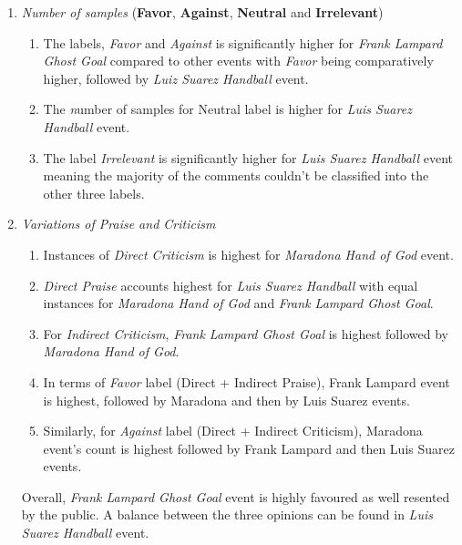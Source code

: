 \documentclass[sigconf, review]{acmart}
\begin{document}
\begin{enumerate}
    \item \textit{Number of samples} (\textbf{Favor}, \textbf{Against}, \textbf{Neutral} and \textbf{Irrelevant})
    \begin{enumerate}
    \item The labels, \textit{Favor} and \textit{Against} is significantly higher for  \textit{Frank Lampard Ghost Goal} compared to other events with \textit{Favor} being comparatively higher, followed by \textit{Luiz Suarez Handball} event.
    \item The \textit number of samples for {Neutral} label is higher for \textit{Luis Suarez Handball} event.
    \item The label \textit{Irrelevant} is significantly higher for \textit{Luis Suarez Handball} event meaning the majority of the comments couldn't be classified into the other three labels.
   
    \end{enumerate}
    \item \textit{Variations of Praise and Criticism}
    \begin{enumerate}
        \item Instances of \textit{Direct Criticism} is highest for \textit{Maradona Hand of God} event.
        \item \textit{Direct Praise} accounts highest for \textit{Luis Suarez Handball} with equal instances for \textit{Maradona Hand of God} and \textit{Frank Lampard Ghost Goal}.
        \item For \textit{Indirect Criticism}, \textit{Frank Lampard Ghost Goal} is highest followed by \textit{Maradona Hand of God}.
        \item In terms of \textit{Favor} label (Direct + Indirect Praise), Frank Lampard event is highest, followed by Maradona and then by Luis Suarez events.
        \item  Similarly, for \textit{Against} label (Direct + Indirect Criticism), Maradona event's count is highest followed by Frank Lampard and then Luis Suarez events.
    
    \end{enumerate}
    
     Overall, \textit{Frank Lampard Ghost Goal} event is highly favoured as well resented by the public. A balance between the three opinions can be found in \textit{Luis Suarez Handball} event.


\end{enumerate}
\end{document}
